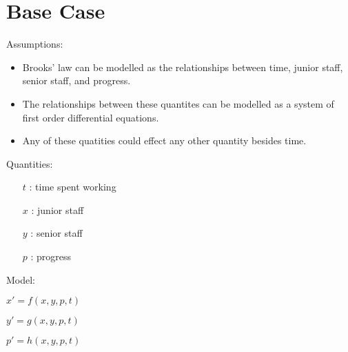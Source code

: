 \documentclass{article}
\newenvironment{atomize}
    {\begin{list} {} {
            \setlength\itemindent{0pt}
            \setlength\leftmargin{10pt}
            \setlength\labelwidth{0pt}
    }}
    {\end{list}}
\begin{document}
\section*{Base Case}
    \begin{atomize}
        \item Assumptions:
            \begin{itemize}
                \item Brooks' law can be modelled as the relationships between time, junior staff, senior staff, and progress.
                \item The relationships between these quantites can be modelled as a system of first order differential equations.
                \item Any of these quatities could effect any other quantity besides time.
            \end{itemize}
        \item Quantities:
            \begin{itemize}
                \item [$t$]: time spent working
                \item [$x$]: junior staff
                \item [$y$]: senior staff
                \item [$p$]: progress
            \end{itemize}
        \item Model:
            \begin{atomize}
                \item $x\prime = f\left(x, y, p, t\right)$
                \item $y\prime = g\left(x, y, p, t\right)$
                \item $p\prime = h\left(x, y, p, t\right)$
            \end{atomize}
    \end{atomize}
\end{document}
